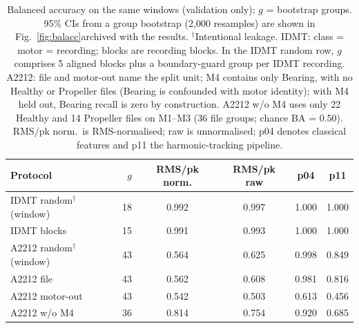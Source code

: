 
\begin{table}[t]
\centering
\scriptsize
\setlength{\tabcolsep}{3pt}
\caption{Balanced accuracy on the same windows (validation only); $g$ = bootstrap groups. 95\% CIs from a group bootstrap (2{,}000 resamples) are \ifwip shown in Fig.~\ref{fig:balacc}\else archived with the results\fi. $^\dagger$Intentional leakage. IDMT: class = motor = recording; blocks are recording blocks. In the IDMT random row, $g$ comprises 5 aligned blocks plus a boundary-guard group per IDMT recording. A2212: file and motor-out name the split unit; M4 contains only Bearing, with no Healthy or Propeller files (Bearing is confounded with motor identity); with M4 held out, Bearing recall is zero by construction. A2212 w/o M4 uses only 22 Healthy and 14 Propeller files on M1--M3 (36 file groups; chance BA = 0.50). RMS/pk norm.\ is RMS-normalised; raw is unnormalised; p04 denotes classical features and p11 the harmonic-tracking pipeline.}
\label{tab:desempenho-compacto}
\begin{tabular}{@{}p{1.7cm}rcccc@{}}
\toprule
Protocol & $g$ & RMS/pk norm. & RMS/pk raw & p04 & p11 \\
\midrule
IDMT random$^\dagger$ (window) & 18 & 0.992 & 0.997 & 1.000 & 1.000 \\
IDMT blocks & 15 & 0.991 & 0.993 & 1.000 & 1.000 \\
A2212 random$^\dagger$ (window) & 43 & 0.564 & 0.625 & 0.998 & 0.849 \\
A2212 file & 43 & 0.562 & 0.608 & 0.981 & 0.816 \\
A2212 motor-out & 43 & 0.542 & 0.503 & 0.613 & 0.456 \\
A2212 w/o M4 & 36 & 0.814 & 0.754 & 0.920 & 0.685 \\
\bottomrule
\end{tabular}
\end{table}
